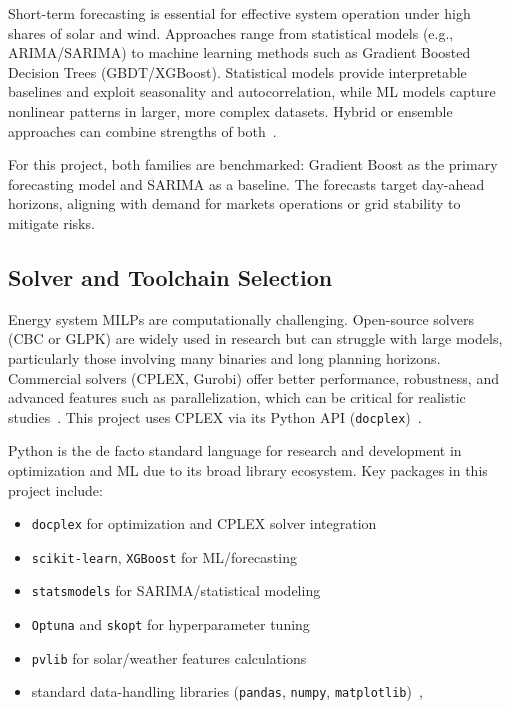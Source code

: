 Short-term forecasting is essential for effective system operation under high shares of solar and 
wind. Approaches range from statistical models (e.g., ARIMA/SARIMA) to machine learning 
methods such as Gradient Boosted Decision Trees (GBDT/XGBoost). Statistical 
models provide interpretable baselines and exploit seasonality and autocorrelation, while ML models 
capture nonlinear patterns in larger, more complex datasets. Hybrid or ensemble approaches can 
combine strengths of both~\cite{grzebyk2021xgboost, zhong2020xgboost}.

For this project, both families are benchmarked: Gradient Boost as the primary forecasting model and 
SARIMA as a baseline. The forecasts target day-ahead horizons, aligning with demand for markets operations
or grid stability to mitigate risks.

\subsection{Solver and Toolchain Selection}

Energy system MILPs are computationally challenging. Open-source solvers (CBC or GLPK) are widely 
used in research but can struggle with large models, particularly those involving many binaries and 
long planning horizons. Commercial solvers (CPLEX, Gurobi) offer better performance, robustness, and 
advanced features such as parallelization, which can be critical for realistic 
studies~\cite{mittelmann2023benchmarks}. This project uses CPLEX via its Python API 
(\texttt{docplex})~\cite{ibm2022cplexpython}.

Python is the de facto standard language for research and development in optimization and ML due to 
its broad library ecosystem. Key packages in this project include:
\begin{itemize}
    \item \texttt{docplex} for optimization and CPLEX solver integration~\cite{ibm2022cplexpython}
    \item \texttt{scikit-learn}, \texttt{XGBoost} for ML/forecasting ~\cite{grzebyk2021xgboost, zhong2020xgboost, scikit-learn}
    \item \texttt{statsmodels} for SARIMA/statistical modeling~\cite{seabold2010statsmodels}
    \item \texttt{Optuna} and \texttt{skopt} for hyperparameter tuning ~\cite{head2018scikitoptimize}
    \item \texttt{pvlib} for solar/weather features calculations~\cite{holmgren2018pvlib}
    \item standard data-handling libraries (\texttt{pandas}, \texttt{numpy}, \texttt{matplotlib})~\cite{mckinney-proc-scipy-2010},~\cite{harris2020array}
\end{itemize}

